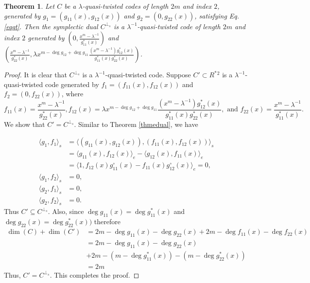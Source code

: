 \documentclass[12 pt]{extarticle}
\numberwithin{equation}{section}
\newtheorem{theorem}{Theorem}[section]
\theoremstyle{definition}
\begin{document}
\begin{theorem}\label{thmsdual}
   Let $C$ be a $\lambda$-quasi-twisted codes of length $2m$ and index $2$, generated by $g_1=(g_{11}(x),g_{12}(x))$ and $g_2=(0,g_{22}(x))$, satisfying Eq. \ref{eqqt}. Then the symplectic dual $C^{\perp_s}$ is a $\lambda^{-1}$-quasi-twisted code of length $2m$ and index $2$ generated by   
   $\left ( 0,\frac{x^m-\lambda^{-1}}{g_{11}^*(x)}\right)$ and 
   $\left ( \frac{x^m-\lambda^{-1}}{g_{22}^*(x)}, \lambda x^{m-\deg g_{12}+\deg g_{11}}\frac{(x^m-\lambda^{-1})g_{12}^*(x)}{g_{11}^*(x)g_{22}^*(x)}  \right )$.
\end{theorem}
\begin{proof}
    It is clear that $C^{\perp_s}$ is a $\lambda^{-1}$-quasi-twisted code. Suppose $C'\subset  R^*{^2}$ is a $\lambda^{-1}$-quasi-twisted code generated by $f_1=(f_{11}(x),f_{12}(x))$ and $f_2=(0,f_{22}(x))$, where
    $$f_{11}(x)= \frac{x^m-\lambda^{-1}}{g^*_{22}(x)}, f_{12}(x)=\lambda x^{m-\deg g_{12}+\deg g_{11}}\frac{(x^m-\lambda^{-1})g_{12}^*(x)}{g_{11}^*(x)g_{22}^*(x)}, \text{ and }f_{22}(x)=\frac{x^m-\lambda^{-1}}{g_{11}^*(x)} .$$
We show that $C'=C^{\perp_s}$. Similar to Theorem \ref{thmedual}, we have


\begin{equation*}
\begin{split}
   \langle  g_1,f_1\rangle_s&=\langle (g_{11}(x),g_{12}(x)),(f_{11}(x),f_{12}(x))\rangle_s\\
            &=\langle g_{11}(x),f_{12}(x)\rangle_e-\langle g_{12}(x),f_{11}(x)\rangle_e \\
            &=\langle 1,f_{12}(x)g_{11}^{\circ}(x)-f_{11}(x)g_{12}^{\circ}(x)\rangle_e=0, \\
        \langle  g_1,f_2\rangle_s&=0,\\
        \langle  g_2,f_1\rangle_s&=0,\\
        \langle  g_2,f_2\rangle_s&=0.
\end{split}
\end{equation*}
Thus $C'\subseteq C^{\perp_s}$. Also,
since  $\deg g_{11}(x)=\deg g^*_{11}(x)$  and  $\deg g_{22}(x)=\deg g^*_{22}(x))$ therefore
    \begin{equation*}
        \begin{split}
            \dim(C)+\dim(C')&=2m-\deg g_{11}(x)-\deg g_{22}(x)+2m-\deg f_{11}(x)-\deg f_{22}(x)\\
            &=2m-\deg g_{11}(x)-\deg g_{22}(x)\\
            &+2m- (m-\deg g^*_{11}(x))- (m-\deg g^*_{22}(x))\\
            &=2m\  
        \end{split}
    \end{equation*}
Thus, $C'=C^{\perp_s}$. This completes the proof.
\end{proof}
\end{document}
